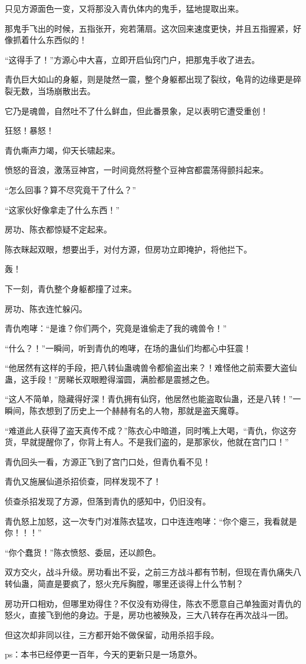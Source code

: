 \begin{this_body}
只见方源面色一变，又将那没入青仇体内的鬼手，猛地提取出来。

那鬼手飞出的时候，五指张开，宛若蒲扇。这次回来速度更快，并且五指握紧，好像抓着什么东西似的！

“这得手了！”方源心中大喜，立即开启仙窍门户，把那鬼手收了进去。

青仇巨大如山的身躯，则是陡然一震，整个身躯都出现了裂纹，龟背的边缘更是碎裂无数，当场崩散出去。

它乃是魂兽，自然吐不了什么鲜血，但此番景象，足以表明它遭受重创！

狂怒！暴怒！

青仇嘶声力竭，仰天长啸起来。

愤怒的音浪，激荡豆神宫，一时间竟然将整个豆神宫都震荡得颤抖起来。

“怎么回事？算不尽究竟干了什么？”

“这家伙好像拿走了什么东西！”

房功、陈衣都惊疑不定起来。

陈衣眯起双眼，想要出手，对付方源，但房功立即掩护，将他拦下。

轰！

下一刻，青仇整个身躯都撞了过来。

房功、陈衣连忙躲闪。

青仇咆哮：“是谁？你们两个，究竟是谁偷走了我的魂兽令！”

“什么？！”一瞬间，听到青仇的咆哮，在场的蛊仙们均都心中狂震！

“他居然有这样的手段，把八转仙蛊魂兽令都偷盗出来？！难怪他之前索要大盗仙蛊，这手段！”房睇长双眼瞪得溜圆，满脸都是震撼之色。

“这人不简单，隐藏得好深！青仇拥有仙窍，他居然也能盗取仙蛊，还是八转！”一瞬间，陈衣想到了历史上一个赫赫有名的人物，那就是盗天魔尊。

“难道此人获得了盗天真传不成？”陈衣心中暗道，同时嘴上大喝，“青仇，你这夯货，早就提醒你了，你背上有人。不是我们盗的，是那家伙，他就在宫门口！”

青仇回头一看，方源正飞到了宫门口处，但青仇看不见！

青仇又施展仙道杀招侦查，同样发现不了！

侦查杀招发现了方源，但落到青仇的感知中，仍旧没有。

青仇怒上加怒，这一次专门对准陈衣猛攻，口中连连咆哮：“你个瘪三，我看就是你！！！”

“你个蠢货！”陈衣愤怒、委屈，还以颜色。

双方交火，战斗升级。房功看出不妥，之前三方战斗都有节制，但现在青仇痛失八转仙蛊，简直是要疯了，怒火充斥胸膛，哪里还谈得上什么节制？

房功开口相劝，但哪里劝得住？不仅没有劝得住，陈衣不愿意自己单独面对青仇的怒火，直接飞到他的身边。于是，房功也被殃及，三大八转存在再次战斗一团。

但这次却非同以往，三方都开始不做保留，动用杀招手段。

ps：本书已经停更一百年，今天的更新只是一场意外。

\end{this_body}

